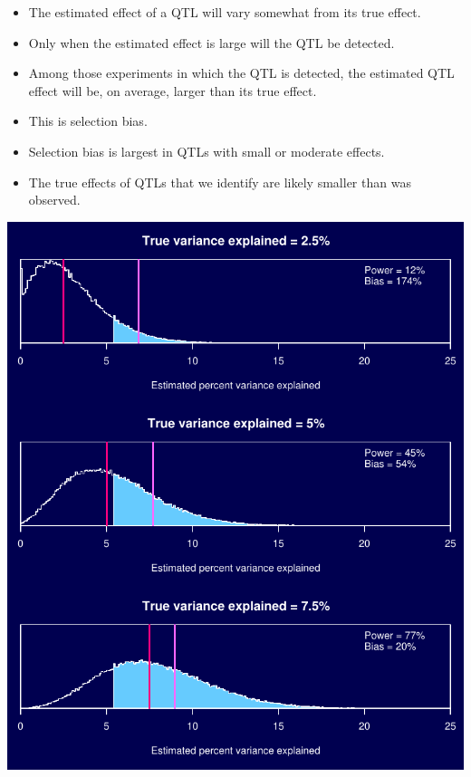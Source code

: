 \documentclass[12pt]{article}
\newcommand{\smallestsize}{\fontsize{18}{22} \selectfont}
\begin{document}
\hspace*{0.5in}
\begin{minipage}[t]{4.1in}
\vspace*{5mm}

\sloppy
\smallestsize
\begin{itemize}
\setlength{\rightskip}{0pt plus 1fil} %
\item The estimated effect of a QTL will vary somewhat from its true
effect.
\item Only when the estimated effect is large will the QTL be
detected.
\item Among those experiments in which the QTL is detected, the estimated
QTL effect will be, on average, larger than its true effect.
\item This is {\color{mypink} selection bias}.
\item Selection bias is largest in QTLs with small or moderate effects.
\item The true effects of QTLs that we identify are likely smaller
than was observed.
\end{itemize}
\end{minipage}
\hfill
\begin{minipage}[t]{5.3in}
\vspace*{0mm}

\includegraphics{FigsA/selbias.pdf}
\end{minipage}
\end{document}
